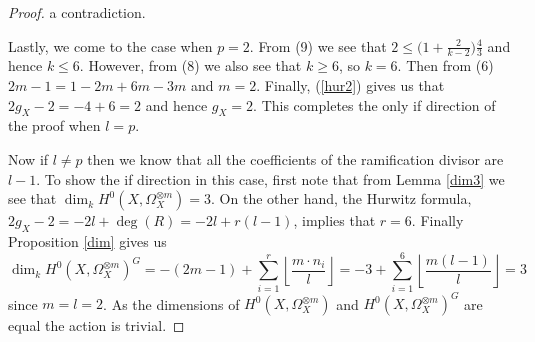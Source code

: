 \documentclass[11pt]{article} %
\theoremstyle{remark}\newtheorem*{rem}{Remark}
\begin{document}
\begin{proof}
	a contradiction.

	Lastly, we come to the case when $p=2$. From (9) we see that $2\leq \Big(1+\frac{2}{k-2}\Big)\frac{4}{3}$ 
	and hence $k\leq 6$. However, from (8) we also see that $k\geq 6$, so $k=6$. Then from (6) $2m-1=1-2m+6m-3m$
	and $m=2$. Finally, (\ref{hur2}) gives us that $2g_X-2=-4+6=2$ and hence $g_X=2$. 
	This completes the only if direction of the proof when $l=p$.

    Now if $l\neq p$ then we know that all the coefficients of the ramification divisor are $l-1$. 
    To show the if direction in this case, first note that from Lemma \ref{dim3} we see that $\dim_kH^0(X,\Omega_X^{\otimes m})=3$. 
    On the other hand, the Hurwitz formula, $2g_X-2=-2l+\deg(R)=-2l+r(l-1)$, implies that $r=6$. 
    Finally Proposition \ref{dim} gives us
      \begin{equation*}
	\dim_kH^0(X,\Omega_X^{\otimes m})^G = -(2m-1) + \sum_{i=1}^r \left\lfloor \frac{m\cdot n_i}{l} \right\rfloor
	= -3 +\sum_{i=1}^6 \left\lfloor \frac{m(l-1)}{l} \right\rfloor
	= 3
      \end{equation*}
    since $m=l=2$.
    As the dimensions of $H^0(X,\Omega_X^{\otimes m})$ and $H^0(X,\Omega_X^{\otimes m})^G$ are equal the action is trivial.



\end{proof}
\end{document}
